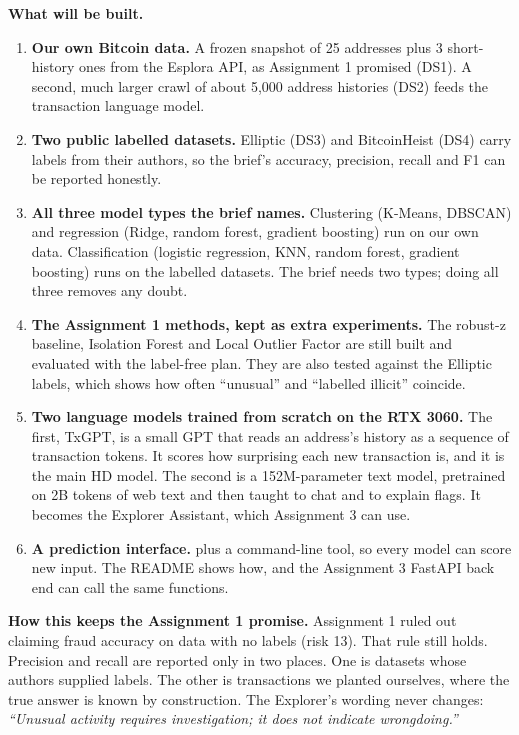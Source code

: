 \textbf{What will be built.}
\begin{enumerate}
  \item \textbf{Our own Bitcoin data.} A frozen snapshot of 25 addresses plus 3 short-history ones
    from the Esplora API, as Assignment 1 promised (DS1). A second, much larger crawl of about
    5,000 address histories (DS2) feeds the transaction language model.
  \item \textbf{Two public labelled datasets.} Elliptic (DS3) and BitcoinHeist (DS4) carry labels
    from their authors, so the brief's accuracy, precision, recall and F1 can be reported honestly.
  \item \textbf{All three model types the brief names.} Clustering (K-Means, DBSCAN) and regression
    (Ridge, random forest, gradient boosting) run on our own data. Classification (logistic
    regression, KNN, random forest, gradient boosting) runs on the labelled datasets. The brief
    needs two types; doing all three removes any doubt.
  \item \textbf{The Assignment 1 methods, kept as extra experiments.} The robust-z baseline,
    Isolation Forest and Local Outlier Factor are still built and evaluated with the label-free
    plan. They are also tested against the Elliptic labels, which shows how often ``unusual''
    and ``labelled illicit'' coincide.
  \item \textbf{Two language models trained from scratch on the RTX 3060.} The first, TxGPT, is a
    small GPT that reads an address's history as a sequence of transaction tokens. It scores how
    surprising each new transaction is, and it is the main HD model. The second is a 152M-parameter
    text model, pretrained on 2B tokens of web text and then taught to chat and to explain flags.
    It becomes the Explorer Assistant, which Assignment 3 can use.
  \item \textbf{A prediction interface.}  plus a command-line tool, so every model
    can score new input. The README shows how, and the Assignment 3 FastAPI back end can call
    the same functions.
\end{enumerate}

\textbf{How this keeps the Assignment 1 promise.} Assignment 1 ruled out claiming fraud accuracy on
data with no labels (risk 13). That rule still holds. Precision and recall are reported only in two
places. One is datasets whose authors supplied labels. The other is transactions we planted
ourselves, where the true answer is known by construction. The Explorer's wording never changes:
\emph{``Unusual activity requires investigation; it does not indicate wrongdoing.''}

